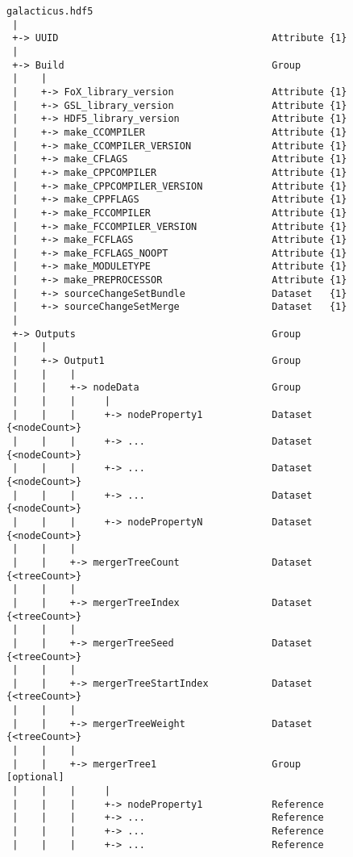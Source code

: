 \begin{figure}
\begin{center}
\begin{verbatim}
galacticus.hdf5
 |
 +-> UUID                                     Attribute {1}
 |
 +-> Build                                    Group
 |    |
 |    +-> FoX_library_version                 Attribute {1}
 |    +-> GSL_library_version                 Attribute {1}
 |    +-> HDF5_library_version                Attribute {1}
 |    +-> make_CCOMPILER                      Attribute {1}
 |    +-> make_CCOMPILER_VERSION              Attribute {1}
 |    +-> make_CFLAGS                         Attribute {1}
 |    +-> make_CPPCOMPILER                    Attribute {1}
 |    +-> make_CPPCOMPILER_VERSION            Attribute {1}
 |    +-> make_CPPFLAGS                       Attribute {1}
 |    +-> make_FCCOMPILER                     Attribute {1}
 |    +-> make_FCCOMPILER_VERSION             Attribute {1}
 |    +-> make_FCFLAGS                        Attribute {1}
 |    +-> make_FCFLAGS_NOOPT                  Attribute {1}
 |    +-> make_MODULETYPE                     Attribute {1}
 |    +-> make_PREPROCESSOR                   Attribute {1}
 |    +-> sourceChangeSetBundle               Dataset   {1}
 |    +-> sourceChangeSetMerge                Dataset   {1}
 |
 +-> Outputs                                  Group
 |    |
 |    +-> Output1                             Group
 |    |    |
 |    |    +-> nodeData                       Group
 |    |    |     |
 |    |    |     +-> nodeProperty1            Dataset {<nodeCount>}
 |    |    |     +-> ...                      Dataset {<nodeCount>}
 |    |    |     +-> ...                      Dataset {<nodeCount>}
 |    |    |     +-> ...                      Dataset {<nodeCount>}
 |    |    |     +-> nodePropertyN            Dataset {<nodeCount>}
 |    |    |
 |    |    +-> mergerTreeCount                Dataset {<treeCount>}
 |    |    |
 |    |    +-> mergerTreeIndex                Dataset {<treeCount>}
 |    |    |
 |    |    +-> mergerTreeSeed                 Dataset {<treeCount>}
 |    |    |
 |    |    +-> mergerTreeStartIndex           Dataset {<treeCount>}
 |    |    |
 |    |    +-> mergerTreeWeight               Dataset {<treeCount>}
 |    |    |
 |    |    +-> mergerTree1                    Group              [optional]
 |    |    |     |
 |    |    |     +-> nodeProperty1            Reference
 |    |    |     +-> ...                      Reference
 |    |    |     +-> ...                      Reference
 |    |    |     +-> ...                      Reference

\end{verbatim}
\end{center}
\end{figure}
